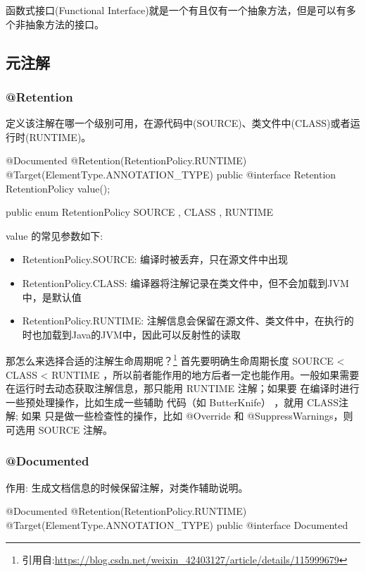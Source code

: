 函数式接口(Functional Interface)就是一个有且仅有一个抽象方法，但是可以有多个非抽象方法的接口。

\subsection{元注解}

\subsubsection{@Retention}

定义该注解在哪一个级别可用，在源代码中(SOURCE)、类文件中(CLASS)或者运行时(RUNTIME)。

\begin{Java}
@Documented
@Retention(RetentionPolicy.RUNTIME)
@Target(ElementType.ANNOTATION_TYPE)
public @interface Retention {
    RetentionPolicy value();
}

public enum RetentionPolicy {
    SOURCE , CLASS , RUNTIME
}
\end{Java}

value 的常见参数如下:
\begin{itemize}
    \item RetentionPolicy.SOURCE: 编译时被丢弃，只在源文件中出现
    \item RetentionPolicy.CLASS: 编译器将注解记录在类文件中，但不会加载到JVM中，是默认值
    \item RetentionPolicy.RUNTIME: 注解信息会保留在源文件、类文件中，在执行的时也加载到Java的JVM中，因此可以反射性的读取
\end{itemize}

那怎么来选择合适的注解生命周期呢？\footnote{引用自:\url{https://blog.csdn.net/weixin_42403127/article/details/115999679}}
首先要明确生命周期长度 SOURCE < CLASS < RUNTIME ，所以前者能作用的地方后者一定也能作用。一般如果需要 
在运行时去动态获取注解信息，那只能用 RUNTIME 注解；如果要 在编译时进行一些预处理操作，比如生成一些辅助
代码（如 ButterKnife） ，就用 CLASS注解; 如果 只是做一些检查性的操作，比如 @Override 和
 @SuppressWarnings，则 可选用 SOURCE 注解。

\subsubsection{@Documented}

作用: 生成文档信息的时候保留注解，对类作辅助说明。

\begin{Java}
@Documented
@Retention(RetentionPolicy.RUNTIME)
@Target(ElementType.ANNOTATION_TYPE)
public @interface Documented {}
\end{Java}

